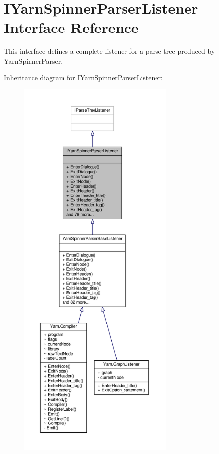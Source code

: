 \hypertarget{a00118}{\section{I\-Yarn\-Spinner\-Parser\-Listener Interface Reference}
\label{a00118}
}


This interface defines a complete listener for a parse tree produced by Yarn\-Spinner\-Parser.  




Inheritance diagram for I\-Yarn\-Spinner\-Parser\-Listener\-:
\nopagebreak
\begin{figure}[H]
\begin{center}
\leavevmode
\includegraphics[height=550pt]{a00370}
\end{center}
\end{figure}


